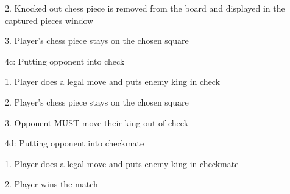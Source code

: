 \documentclass[letterpaper,11pt]{article}
\begin{document}
\begin{list}{}{}
\begin{list}{}{}
\begin{list}{}{}
					\item 2. Knocked out chess piece is removed from the board and displayed in the captured pieces window
					\item 3. Player's chess piece stays on the chosen square
				\end{list}
			\item 4c: Putting opponent into check
			\item \begin{list}{}{}
					\item 1. Player does a legal move and puts enemy king in check
					\item 2. Player's chess piece stays on the chosen square
					\item 3. Opponent MUST move their king out of check
				\end{list}
			\item 4d: Putting opponent into checkmate
			\item \begin{list}{}{}
					\item 1. Player does a legal move and puts enemy king in checkmate
					\item 2. Player wins the match
				\end{list}
		\end{list}
\end{list}
\end{document}
